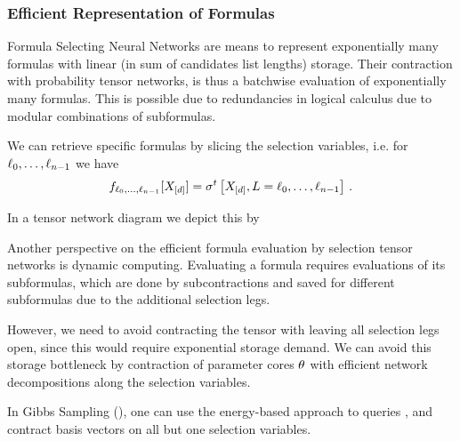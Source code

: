 \subsubsection{Efficient Representation of Formulas}

Formula Selecting Neural Networks are means to represent exponentially many formulas with linear (in sum of candidates list lengths) storage.
Their contraction with probability tensor networks, is thus a batchwise evaluation of exponentially many formulas.
This is possible due to redundancies in logical calculus due to modular combinations of subformulas.

We can retrieve specific formulas by slicing the selection variables, i.e. for $\ell_{0},\ldots,\ell_{n-1}$ we have
\[ f_{\ell_{0},\ldots,\ell_{n-1}}[X_{[d]}] = \sigma^{t}\left[X_{[d]},L=\ell_{0},\ldots,\ell_{n-1}\right] \, .  \]

In a tensor network diagram we depict this by
\begin{center}
    
\end{center}

Another perspective on the efficient formula evaluation by selection tensor networks is dynamic computing.
Evaluating a formula requires evaluations of its subformulas, which are done by subcontractions and saved for different subformulas due to the additional selection legs.

However, we need to avoid contracting the tensor with leaving all selection legs open, since this would require exponential storage demand.
We can avoid this storage bottleneck by contraction of parameter cores $\theta$ with efficient network decompositions along the selection variables. %

In Gibbs Sampling (), one can use the energy-based approach to queries , and contract basis vectors on all but one selection variables.




